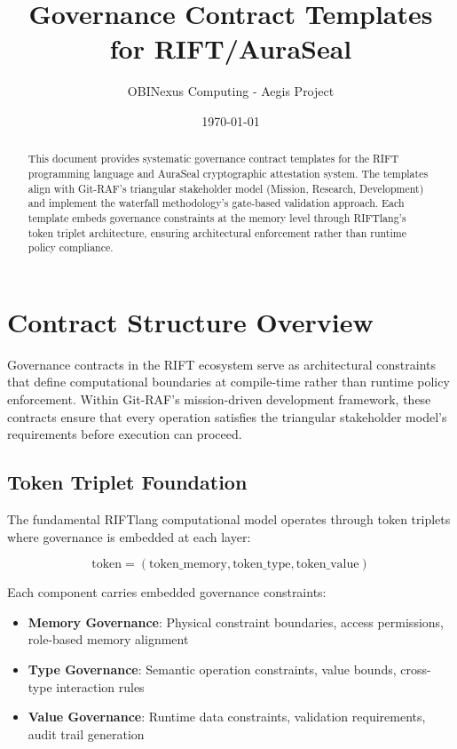 \documentclass[11pt,letterpaper]{article}
\title{Governance Contract Templates for RIFT/AuraSeal}
\author{OBINexus Computing - Aegis Project}
\date{\today}
\begin{document}
\maketitle

\begin{abstract}
This document provides systematic governance contract templates for the RIFT programming language and AuraSeal cryptographic attestation system. The templates align with Git-RAF's triangular stakeholder model (Mission, Research, Development) and implement the waterfall methodology's gate-based validation approach. Each template embeds governance constraints at the memory level through RIFTlang's token triplet architecture, ensuring architectural enforcement rather than runtime policy compliance.
\end{abstract}

\tableofcontents
\newpage

\section{Contract Structure Overview}

Governance contracts in the RIFT ecosystem serve as architectural constraints that define computational boundaries at compile-time rather than runtime policy enforcement. Within Git-RAF's mission-driven development framework, these contracts ensure that every operation satisfies the triangular stakeholder model's requirements before execution can proceed.

\subsection{Token Triplet Foundation}

The fundamental RIFTlang computational model operates through token triplets where governance is embedded at each layer:

\begin{equation}
\text{token} = (\text{token\_memory}, \text{token\_type}, \text{token\_value})
\end{equation}

Each component carries embedded governance constraints:
\begin{itemize}
\item \textbf{Memory Governance}: Physical constraint boundaries, access permissions, role-based memory alignment
\item \textbf{Type Governance}: Semantic operation constraints, value bounds, cross-type interaction rules  
\item \textbf{Value Governance}: Runtime data constraints, validation requirements, audit trail generation
\end{itemize}
\end{document}
